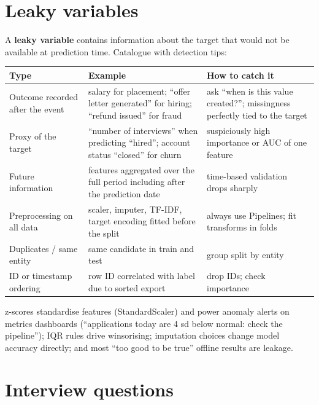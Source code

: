 \section{Leaky variables}
A \textbf{leaky variable} contains information about the target that would not be available at prediction time. Catalogue with detection tips:
\begin{center}\small
\begin{tabularx}{\linewidth}{l X X}
\toprule
Type & Example & How to catch it\\
\midrule
Outcome recorded after the event & salary for placement; ``offer letter generated'' for hiring; ``refund issued'' for fraud & ask ``when is this value created?'';
missingness perfectly tied to the target\\
Proxy of the target & ``number of interviews'' when predicting ``hired''; account status ``closed'' for churn & suspiciously high importance or AUC of one feature\\
Future information & features aggregated over the full period including after the prediction date & time-based validation drops sharply\\
Preprocessing on all data & scaler, imputer, TF-IDF, target encoding fitted before the split & always use Pipelines; fit transforms in folds\\
Duplicates / same entity & same candidate in train and test & group split by entity\\
ID or timestamp ordering & row ID correlated with label due to sorted export & drop IDs; check importance\\
\bottomrule
\end{tabularx}
\end{center}

\begin{practical}
z-scores standardise features (StandardScaler) and power anomaly alerts on metrics dashboards (``applications today are 4 sd below normal: check the pipeline'');
IQR rules drive winsorising; imputation choices change model accuracy directly; and most ``too good to be true'' offline results are leakage.
\end{practical}

\section{Interview questions}

